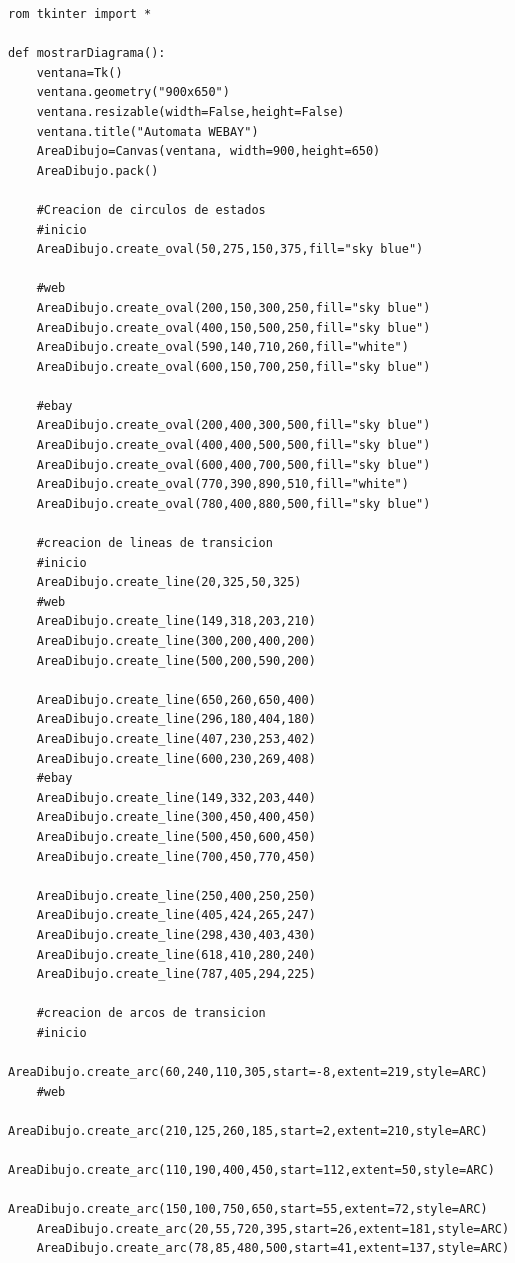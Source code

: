 \lstset{language=Python, breaklines=true, basicstyle=\footnotesize}
\begin{lstlisting}[frame=single]
	rom tkinter import *

def mostrarDiagrama():
    ventana=Tk()
    ventana.geometry("900x650")
    ventana.resizable(width=False,height=False)
    ventana.title("Automata WEBAY")
    AreaDibujo=Canvas(ventana, width=900,height=650)
    AreaDibujo.pack()

    #Creacion de circulos de estados
    #inicio
    AreaDibujo.create_oval(50,275,150,375,fill="sky blue")

    #web
    AreaDibujo.create_oval(200,150,300,250,fill="sky blue")
    AreaDibujo.create_oval(400,150,500,250,fill="sky blue")
    AreaDibujo.create_oval(590,140,710,260,fill="white")
    AreaDibujo.create_oval(600,150,700,250,fill="sky blue")

    #ebay
    AreaDibujo.create_oval(200,400,300,500,fill="sky blue")
    AreaDibujo.create_oval(400,400,500,500,fill="sky blue")
    AreaDibujo.create_oval(600,400,700,500,fill="sky blue")
    AreaDibujo.create_oval(770,390,890,510,fill="white")
    AreaDibujo.create_oval(780,400,880,500,fill="sky blue")

    #creacion de lineas de transicion
    #inicio
    AreaDibujo.create_line(20,325,50,325)
    #web
    AreaDibujo.create_line(149,318,203,210)
    AreaDibujo.create_line(300,200,400,200)
    AreaDibujo.create_line(500,200,590,200)

    AreaDibujo.create_line(650,260,650,400)
    AreaDibujo.create_line(296,180,404,180)
    AreaDibujo.create_line(407,230,253,402)
    AreaDibujo.create_line(600,230,269,408)
    #ebay
    AreaDibujo.create_line(149,332,203,440)
    AreaDibujo.create_line(300,450,400,450)
    AreaDibujo.create_line(500,450,600,450)
    AreaDibujo.create_line(700,450,770,450)

    AreaDibujo.create_line(250,400,250,250)
    AreaDibujo.create_line(405,424,265,247)
    AreaDibujo.create_line(298,430,403,430)
    AreaDibujo.create_line(618,410,280,240)
    AreaDibujo.create_line(787,405,294,225)

    #creacion de arcos de transicion
    #inicio
    AreaDibujo.create_arc(60,240,110,305,start=-8,extent=219,style=ARC)
    #web
    AreaDibujo.create_arc(210,125,260,185,start=2,extent=210,style=ARC)
    AreaDibujo.create_arc(110,190,400,450,start=112,extent=50,style=ARC)
    AreaDibujo.create_arc(150,100,750,650,start=55,extent=72,style=ARC)
    AreaDibujo.create_arc(20,55,720,395,start=26,extent=181,style=ARC)
    AreaDibujo.create_arc(78,85,480,500,start=41,extent=137,style=ARC)


\end{lstlisting}
